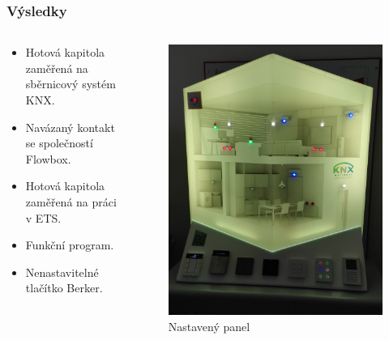 \documentclass[%
  12pt,       				%
	t,                  %
	aspectratio=1610,   %
	unicode,						%
]{beamer}				    	%
\begin{document}
\begin{frame} 
	\frametitle{Výsledky}
	\begin{columns}[T] 								%
		\begin{column}{0.6\textwidth}		%
	        \begin{itemize}
	            \item Hotová kapitola zaměřená na sběrnicový systém KNX.
	            \item Navázaný kontakt se společností Flowbox.
	            \item Hotová kapitola zaměřená na práci v ETS.
	            \item Funkční program.
	            \item Nenastavitelné tlačítko Berker.
	        \end{itemize}
	    \end{column}
	    
	\begin{column}{0.4\textwidth}		%
			\begin{figure}%
				\includegraphics[width=.8\columnwidth]{obrazky/IMG_20211217_121402.jpg}
				\caption{Nastavený panel}
			\end{figure}
		\end{column}
	\end{columns}
\end{frame}
\end{document}
